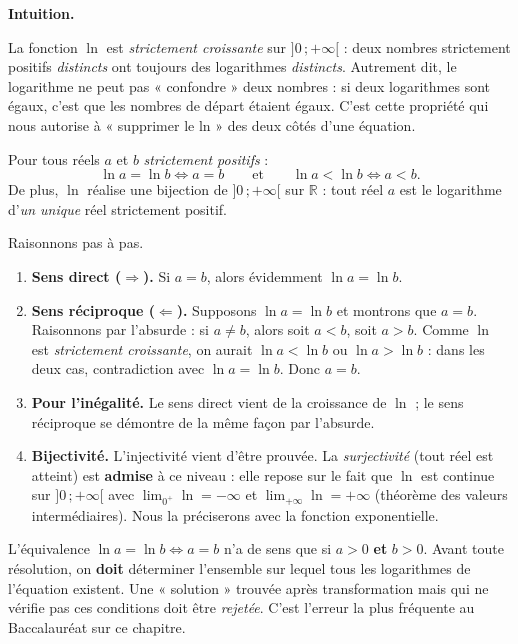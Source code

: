 \documentclass[11pt]{article}
\newcommand{\cle}[1]{{\popxbold\color{popdark}#1}}
\begin{document}
\textbf{Intuition.}\par
La fonction $\ln$ est \emph{strictement croissante} sur $]0\,;+\infty[$ : deux nombres strictement positifs \emph{distincts} ont toujours des logarithmes \emph{distincts}. Autrement dit, le logarithme ne peut pas « confondre » deux nombres : si deux logarithmes sont égaux, c'est que les nombres de départ étaient égaux. C'est cette propriété qui nous autorise à « supprimer le ln » des deux côtés d'une équation.

\begin{propriete}
Pour tous réels $a$ et $b$ \emph{strictement positifs} :
\[ \ln a = \ln b \iff a = b \qquad\text{et}\qquad \ln a < \ln b \iff a < b. \]
De plus, $\ln$ réalise une \cle{bijection} de $]0\,;+\infty[$ sur $\mathbb{R}$ : tout réel $a$ est le logarithme d'\emph{un unique} réel strictement positif.
\end{propriete}

\begin{experience}
Raisonnons pas à pas.
\begin{enumerate}
\item \textbf{Sens direct ($\Rightarrow$).} Si $a = b$, alors évidemment $\ln a = \ln b$.
\item \textbf{Sens réciproque ($\Leftarrow$).} Supposons $\ln a = \ln b$ et montrons que $a = b$. Raisonnons par l'absurde : si $a \neq b$, alors soit $a < b$, soit $a > b$. Comme $\ln$ est \emph{strictement croissante}, on aurait $\ln a < \ln b$ ou $\ln a > \ln b$ : dans les deux cas, contradiction avec $\ln a = \ln b$. Donc $a = b$.
\item \textbf{Pour l'inégalité.} Le sens direct vient de la croissance de $\ln$ ; le sens réciproque se démontre de la même façon par l'absurde.
\item \textbf{Bijectivité.} L'injectivité vient d'être prouvée. La \emph{surjectivité} (tout réel est atteint) est \textbf{admise} à ce niveau : elle repose sur le fait que $\ln$ est continue sur $]0\,;+\infty[$ avec $\lim_{0^+}\ln = -\infty$ et $\lim_{+\infty}\ln = +\infty$ (théorème des valeurs intermédiaires). Nous la préciserons avec la fonction exponentielle.
\end{enumerate}
\end{experience}

\begin{attention}
L'équivalence $\ln a = \ln b \iff a = b$ n'a de sens que si $a > 0$ \textbf{et} $b > 0$. Avant toute résolution, on \textbf{doit} déterminer l'ensemble sur lequel tous les logarithmes de l'équation existent. Une « solution » trouvée après transformation mais qui ne vérifie pas ces conditions doit être \emph{rejetée}. C'est l'erreur la plus fréquente au Baccalauréat sur ce chapitre.
\end{attention}
\end{document}
